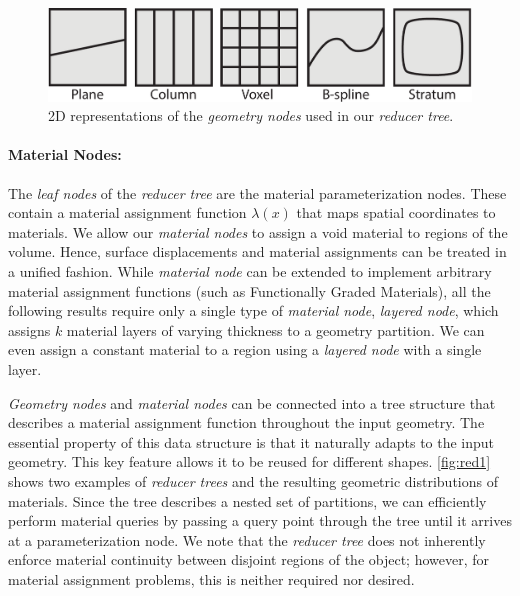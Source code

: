 \begin{figure}[h]
\centering
\includegraphics[width=0.7\linewidth]{figure/geometryNodes}
\caption{2D representations  of the \emph{geometry nodes} used in our \emph{reducer tree}.}
\label{fig:geometryNodes}
\end{figure}

\paragraph{Material Nodes:} The \emph{leaf nodes} of the \emph{reducer tree} are the material parameterization nodes. These contain a material assignment function $\lambda\left(x\right)$ that maps spatial coordinates to materials. We allow our \emph{material nodes} to assign a void material to regions of the volume. Hence, surface displacements and material assignments can be treated in a unified fashion.
While \emph{material node} can be extended to implement arbitrary material assignment functions (such as Functionally Graded Materials), all the following results require only a single type of \emph{material node}, \emph{layered node}, which assigns $k$ material layers of varying thickness to a geometry partition. We can even assign a constant material to a region using a \emph{layered node} with a single layer. 

\emph{Geometry nodes} and \emph{material nodes} can be connected into a tree structure that describes a material assignment function throughout the input geometry. 
The essential property of this data structure is that it naturally adapts to the input geometry. This key feature allows it to be reused for different shapes.
\autoref{fig:red1} shows two examples of \emph{reducer trees} and the resulting geometric distributions of materials.
Since the tree describes a nested set of partitions, we can efficiently perform material queries by passing a query point through the tree until it arrives at a parameterization node. 
We note that the \emph{reducer tree} does not inherently enforce material continuity between disjoint regions of the object; however, for material assignment problems, this is neither required nor desired. 

